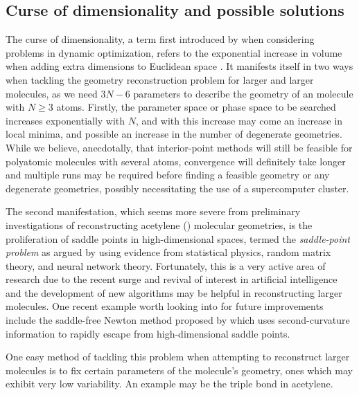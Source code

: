\subsection{Curse of dimensionality and possible solutions}
The curse of dimensionality, a term first introduced by \citet{Bellman57} when considering problems in dynamic optimization, refers to the exponential increase in volume when adding extra dimensions to Euclidean space \citep{Keogh10}. It manifests itself in two ways when tackling the geometry reconstruction problem for larger and larger molecules, as we need $3N-6$ parameters to describe the geometry of an molecule with $N \ge 3$ atoms. Firstly, the parameter space or phase space to be searched increases exponentially with $N$, and with this increase may come an increase in local minima, and possible an increase in the number of degenerate geometries. While we believe, anecdotally, that interior-point methods will still be feasible for polyatomic molecules with several atoms, convergence will definitely take longer and multiple runs may be required before finding a feasible geometry or any degenerate geometries, possibly necessitating the use of a supercomputer cluster.

The second manifestation, which seems more severe from preliminary investigations of reconstructing acetylene () molecular geometries, is the proliferation of saddle points in high-dimensional spaces, termed the \emph{saddle-point problem} as argued by \citet{Pascanu14} using evidence from statistical physics, random matrix theory, and neural network theory. Fortunately, this is a very active area of research due to the recent surge and revival of interest in artificial intelligence \citep{Bengio16,LeCun15} and the development of new algorithms may be helpful in reconstructing larger molecules. One recent example worth looking into for future improvements include the saddle-free Newton method proposed by \citet{Dauphin14} which uses second-curvature information to rapidly escape from high-dimensional saddle points.

One easy method of tackling this problem when attempting to reconstruct larger molecules is to fix certain parameters of the molecule's geometry, ones which may exhibit very low variability. An example may be the triple  bond in acetylene.

